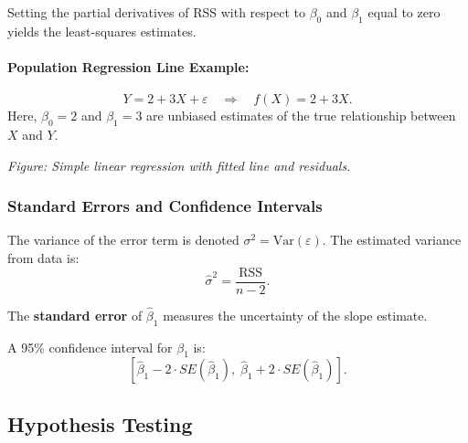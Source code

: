 Setting the partial derivatives of RSS with respect to \(\beta_0\) and \(\beta_1\) equal to zero yields the least-squares estimates.

\paragraph{Population Regression Line Example:}
\[
Y = 2 + 3X + \varepsilon \quad \Rightarrow \quad f(X) = 2 + 3X.
\]
Here, \(\beta_0 = 2\) and \(\beta_1 = 3\) are unbiased estimates of the true relationship between \(X\) and \(Y\).

\begin{center}

\textit{Figure: Simple linear regression with fitted line and residuals.}
\end{center}

\subsubsection{Standard Errors and Confidence Intervals}

The variance of the error term is denoted \(\sigma^2 = \text{Var}(\varepsilon)\).  
The estimated variance from data is:
\[
\widehat{\sigma}^2 = \frac{\text{RSS}}{n - 2}.
\]

The \textbf{standard error} of \(\hat{\beta}_1\) measures the uncertainty of the slope estimate.

A 95\% confidence interval for \(\beta_1\) is:
\[
[\hat{\beta}_1 - 2 \cdot SE(\hat{\beta}_1), \; \hat{\beta}_1 + 2 \cdot SE(\hat{\beta}_1)].
\]

\subsection{Hypothesis Testing}

